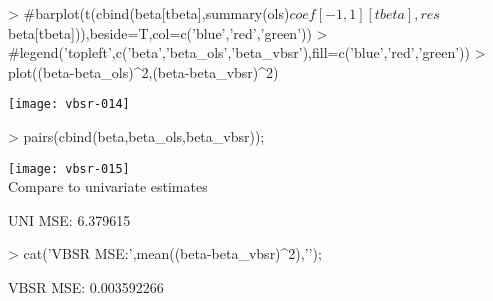 \documentclass[a4paper]{article}
\begin{document}
\begin{Schunk}
\begin{Sinput}
> #barplot(t(cbind(beta[tbeta],summary(ols)$coef[-1,1][tbeta],res$beta[tbeta])),beside=T,col=c('blue','red','green'))
> #legend('topleft',c('beta','beta_ols','beta_vbsr'),fill=c('blue','red','green'))
> plot((beta-beta_ols)^2,(beta-beta_vbsr)^2)
\end{Sinput}
\end{Schunk}
\texttt{[image: vbsr-014]}
\begin{Schunk}
\begin{Sinput}
> pairs(cbind(beta,beta_ols,beta_vbsr));
\end{Sinput}
\end{Schunk}
\texttt{[image: vbsr-015]}
\\
Compare to univariate estimates
\begin{Schunk}
\begin{Soutput}
UNI MSE: 6.379615 
\end{Soutput}
\begin{Sinput}
> cat('VBSR MSE:',mean((beta-beta_vbsr)^2),'\n');
\end{Sinput}
\begin{Soutput}
VBSR MSE: 0.003592266 
\end{Soutput}
\end{Schunk}
\end{document}
